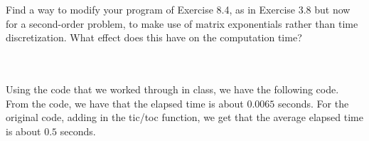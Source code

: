 Find a way to modify your program of Exercise 8.4, as in Exercise 3.8 but now for a second-order
problem, to make use of matrix exponentials rather than time discretization. What effect does this have
on the computation time?\\\\

\begin{solution}\renewcommand{\qedsymbol}{}\ \\
    Using the code that we worked through in class, we have the following code. From the code, we have
    that the elapsed time is about $0.0065$ seconds. For the original code, adding in the tic/toc
    function, we get that the average elapsed time is about $0.5$ seconds.

\end{solution}

\newpage

\newpage